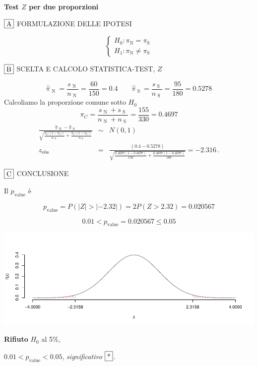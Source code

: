 \documentclass[
  11pt,
]{book}
\theoremstyle{mytheoremstyle}
\theoremstyle{mydefstyle}
\newenvironment{sol}
  {
  \begin{tcolorbox}[enhanced,breakable,arc=0.1mm,boxrule=1pt,colback=white,colframe=iblue,
  title=\bf \fontfamily{lmss}\selectfont \hspace{.5 cm} Soluzione,drop fuzzy shadow]

}{
\end{tcolorbox}
  }
\begin{document}
\begin{sol}
\textbf{Test \(Z\) per due proporzioni}

\(\fbox{A}\) FORMULAZIONE DELLE IPOTESI

\[\begin{cases}
   H_0: \pi_\text{N} = \pi_\text{S} \\
   H_1: \pi_\text{N} \neq \pi_\text{S} 
   \end{cases}\]

\(\fbox{B}\) SCELTA E CALCOLO STATISTICA-TEST, \(Z\)

\[\hat\pi_\text{ N }=\frac{s_\text{ N }}{n_\text{ N }}=\frac{ 60 }{ 150 }= 0.4 \qquad
   \hat\pi_\text{ S }=\frac{s_\text{ S }}{n_\text{ S }}=\frac{ 95 }{ 180 }= 0.5278 \]Calcoliamo la proporzione comune sotto \(H_0\)
\[
     \pi_C=\frac{s_\text{ N }+s_\text{ S }}{n_\text{ N }+n_\text{ S }}=
     \frac{ 155 }{ 330 }= 0.4697 
   \]\begin{eqnarray*}
   \frac{\hat\pi_\text{ N } - \hat\pi_\text{ S }}
   {\sqrt{\frac {\pi_C(1-\pi_C)}{n_\text{ N }}+\frac {\pi_C(1-\pi_C)}{n_\text{ S }}}}&\sim&N(0,1)\\
   z_{\text{obs}}
   &=& \frac{ ( 0.4 -  0.5278 )} {\sqrt{\frac{ 0.4697 (1- 0.4697 )}{ 150 }+\frac{ 0.4697 (1- 0.4697 )}{ 180 }}}
   =   -2.316 \, .
   \end{eqnarray*}

\(\fbox{C}\) CONCLUSIONE

Il \(p_{\text{value}}\) è

\[ p_{\text{value}} = P(|Z|>|-2.32|)=2P(Z>2.32)=0.020567 \]

\[
 0.01 < p_\text{value}= 0.020567 \leq 0.05 
\]

\begin{center}\includegraphics{Esami_passati_con_soluzioni_files/figure-latex/2024-68-1} \end{center}

\textbf{Rifiuto} \(H_0\) al 5\%,

\(0.01<p_\text{value}<0.05\), \emph{significativo} \(\fbox{*}\).

\end{sol}
\end{document}
